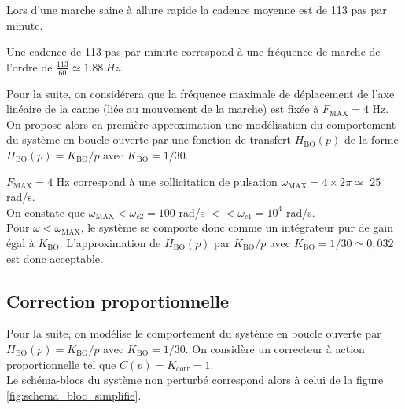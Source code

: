 \begin{multicols}{2}
\ifprof
\else

Lors d'une marche saine à allure rapide la cadence moyenne est de 113 pas par minute.
\fi


\ifprof
\begin{corrige}
Une cadence de 113 pas par minute correspond à une fréquence de marche de l'ordre de $\frac{113}{60} \simeq  \SI{1,88}{Hz}$.
 \end{corrige}
\fi

\ifprof
\else
\vspace*{1em}
Pour la suite, on considérera que la fréquence maximale de déplacement de l'axe linéaire de  la canne (liée au mouvement de la marche) est fixée à $F_{\text{MAX}} = 4$ Hz. On propose alors en première approximation une modélisation du comportement du système en boucle ouverte par une fonction de transfert $H_{\text{BO}}(p)$ de la forme $H_{\text{BO}}(p) = K_{\text{BO}}/p$ avec $K_{\text{BO}} = 1/30$.
\fi


\ifprof
\begin{corrige}
$F_{\text{MAX}} = 4$ Hz correspond à une sollicitation de pulsation $\omega_{\text{MAX}} = 4 \times 2 \pi \simeq $ 25 rad/s. \\
On constate que $\omega_{\text{MAX}}  <  \omega_{c2} = 100$ rad/s $<< \omega_{c1} = 10^{4}$ rad/s. \\
Pour $\omega < \omega_{\text{MAX}}$, le système se comporte donc comme un intégrateur pur de gain égal à $K_{\text{BO}}$. L'approximation de $H_{\text{BO}}(p)$ par $K_{\text{BO}}/p$ avec $K_{\text{BO}} = 1/30 \simeq 0,032$ est donc acceptable.
\end{corrige}
\fi

\ifprof
\else
\subsection*{Correction proportionnelle}

Pour la suite, on modélise le comportement du système en boucle ouverte par $H_{\text{BO}}(p) = K_{\text{BO}}/p$ avec $K_{\text{BO}} = 1/30$. On considère un correcteur à action proportionnelle tel que $C(p) = K_{\text{corr}} = 1$. \\
Le schéma-blocs du système non perturbé correspond alors à celui de la figure \ref{fig:schema_bloc_simplifie}.


\end{multicols}

